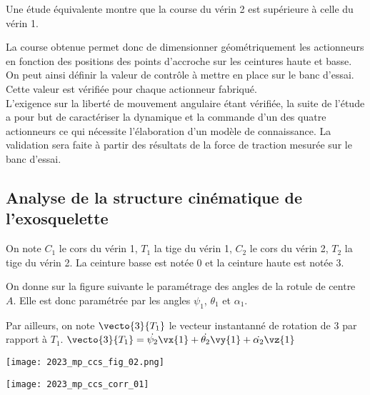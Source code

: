 \ifprof
\else

Une étude équivalente montre que la course du vérin 2 est supérieure à celle du vérin 1.

La course obtenue permet donc de dimensionner géométriquement les actionneurs en fonction des positions des points d'accroche sur les ceintures haute et basse. On peut ainsi définir la valeur de contrôle à mettre en place sur le banc d'essai. Cette valeur est vérifiée pour chaque actionneur fabriqué.\\
L'exigence sur la liberté de mouvement angulaire étant vérifiée, la suite de l'étude a pour but de caractériser la dynamique et la commande d'un des quatre actionneurs ce qui nécessite l'élaboration d'un modèle de connaissance. La validation sera faite à partir des résultats de la force de traction mesurée sur le banc d'essai.
\fi

\subsection{Analyse de la structure cinématique de l'exosquelette} %

\ifprof
\else

On note $C_1$ le cors du vérin 1, $T_1$ la tige du vérin 1, $C_2$ le cors du vérin 2, $T_2$ la tige du vérin 2.
La ceinture basse est notée 0 et la ceinture haute est notée 3. 

On donne sur la figure suivante le paramétrage des angles de la rotule de centre $A$.  Elle est donc paramétrée par les angles $\psi_1$, $\theta_1$ et $\alpha_1$.

Par ailleurs, on note $\vecto{3}{T_1}$ le vecteur instantanné de rotation de 3 par rapport à $T_1$.  $\vecto{3}{T_1} = \dot{\psi_2} \vx{1}+\dot{\theta_2} \vy{1}+\dot{\alpha_2} \vz{1}$
\begin{center}
\texttt{[image: 2023\_mp\_ccs\_fig\_02.png]}
\end{center}
 \fi
 
 
\ifprof
\begin{corrige}
\begin{center}
\texttt{[image: 2023\_mp\_ccs\_corr\_01]}
\end{center}
\end{corrige}
\else
\fi

